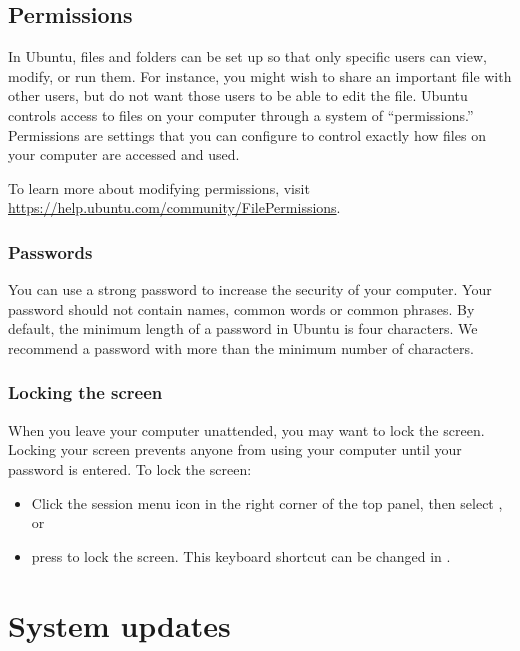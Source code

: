 \subsection{Permissions}
\label{sec:permissions}

In Ubuntu, files and folders can be set up so that only specific users can view, modify, or run them.  For instance, you might wish to share an important file with other users, but do not want those users to be able to edit the file.  Ubuntu controls access to files on your computer through a system of ``permissions.''  Permissions are settings that you can configure to control exactly how files on your computer are accessed and used.

To learn more about modifying permissions, visit \url{https://help.ubuntu.com/community/FilePermissions}.

\subsubsection{Passwords}
\label{sec:security:passwords}

You can use a strong password to increase the security of your computer. Your password should not contain names, common words or common phrases. By default, the minimum length of a password in Ubuntu is four characters. We recommend a password with more than the minimum number of characters.

\subsubsection{Locking the screen}

When you leave your computer unattended, you may want to lock the screen. Locking your screen prevents anyone from using your computer until your password is entered. To lock the screen:

\begin{itemize}
	\item Click the session menu icon in the right corner of the top panel, then select , or
	\item press  to lock the screen. This keyboard shortcut can be changed in .
\end{itemize}

\section{System updates}
\label{sec:security:system-updates}

